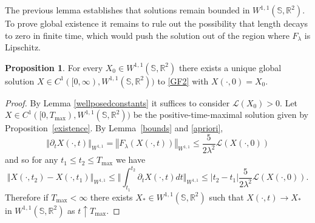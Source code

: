 \documentclass[a4paper,11pt]{amsart}
\theoremstyle{definition}\newtheorem*{definition}{Definition}
\theoremstyle{definition} \newtheorem{proposition}[theorem]{Proposition}
\theoremstyle{definition}\newtheorem{lemma}[theorem]{Lemma}
\theoremstyle{definition}\newtheorem{corollary}[theorem]{Corollary}
\theoremstyle{definition}\newtheorem{example}{Example}
\theoremstyle{remark}\newtheorem*{remark}{Remark}
\def\R{\mathbb{R}}
\def\S{\mathbb{S}}
\newcommand{\norm}[1]{{\left \Vert {#1}\right \Vert}}
\def\length{\mathcal L}
\def\wsr{W^{1,1}(\S,\R^2)}
\begin{document}
The previous lemma establishes that solutions remain bounded in $\wsr$. To prove global existence it remains to rule out the possibility that length decays to zero in finite time, which would push the solution out of the region where $F_\lambda$ is Lipschitz. 


\begin{proposition}\label{globalexistence}
For every $X_0\in W^{1,1}(\S,\R^2)$ there exists a unique global solution
$X\in C^1([0,\infty),W^{1,1}(\S,\R^2))$ to \eqref{GF2} with $X(\cdot,0)=X_0$.
\end{proposition}
\begin{proof}

By Lemma \ref{wellposedconstants} it suffices to consider $\length(X_0)>0$.
Let
$
X\in C^1([0,T_{\max}),W^{1,1}(\S,\R^2))
$
be the positive-time-maximal solution given by Proposition~\ref{existence}.
By Lemma~\ref{bounds} and \ref{apriori},
\[
\norm{\partial_t X(\cdot,t)}_{W^{1,1}}
=\norm{F_\lambda(X(\cdot,t))}_{W^{1,1}}
\le \frac{5}{2\lambda^2}\length(X(\cdot,0))
\]
and so for any $t_1\leq t_2\leq T_{\max}$ we have
\[
\norm{X(\cdot,t_2)-X(\cdot,t_1)}_{W^{1,1}}\leq \Big\Vert \int_{t_1}^{t_2}\partial_t X(\cdot,t)dt\Big\Vert_{W^{1,1}}\leq |t_2-t_1|\frac{5}{2\lambda^2}\length(X(\cdot,0)).
\]
Therefore if $T_{\max}<\infty$ there exists $X_*\in W^{1,1}(\S,\R^2)$ such that
$X(\cdot,t)\to X_*$
in $W^{1,1}(\S,\R^2)$
as $t\uparrow T_{\max}.$


\end{proof}
\end{document}
